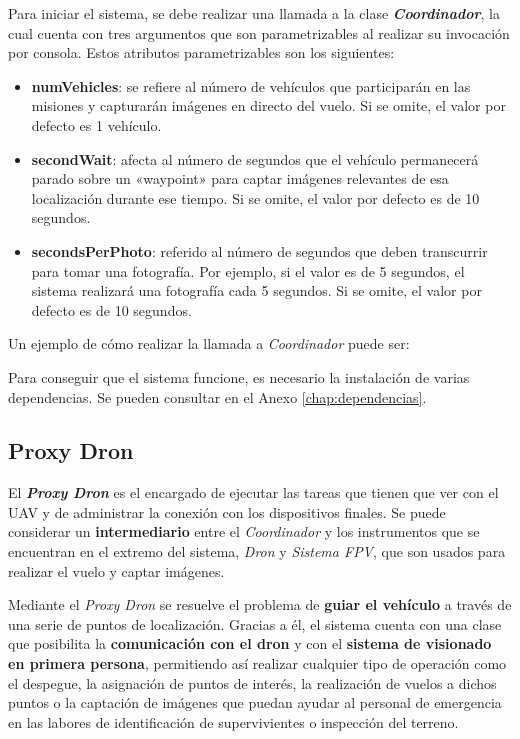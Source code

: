 Para iniciar el sistema, se debe realizar una llamada a la clase \textbf{\textit{Coordinador}}, la cual cuenta con tres argumentos que son parametrizables al realizar su invocación por consola. Estos atributos parametrizables son los siguientes:
\begin{itemize}
\item \textbf{numVehicles}: se refiere al número de vehículos que participarán en las misiones y capturarán imágenes en directo del vuelo. Si se omite, el valor por defecto es 1 vehículo.
\item \textbf{secondWait}: afecta al número de segundos que el vehículo permanecerá parado sobre un «waypoint» para captar imágenes relevantes de esa localización durante ese tiempo. Si se omite, el valor por defecto es de 10 segundos.
\item \textbf{secondsPerPhoto}: referido al número de segundos que deben transcurrir para tomar una fotografía. Por ejemplo, si el valor es de 5 segundos, el sistema realizará una fotografía cada 5 segundos. Si se omite, el valor por defecto es de 10 segundos.
\end{itemize} 

Un ejemplo de cómo realizar la llamada a \textit{Coordinador} puede ser:


Para conseguir que el sistema funcione, es necesario la instalación de varias dependencias. Se pueden consultar en el Anexo \ref{chap:dependencias}.

\subsection{Proxy Dron}
\label{sec:proxydron}

El \textbf{\textit{Proxy Dron}} es el encargado de ejecutar las tareas que tienen que ver con el \acs{UAV} y de administrar la conexión con los dispositivos finales. Se puede considerar un \textbf{intermediario} entre el \textit{Coordinador} y los instrumentos que se encuentran en el extremo del sistema, \textit{Dron} y \textit{Sistema \acs{FPV}}, que son usados para realizar el vuelo y captar imágenes.

Mediante el \textit{Proxy Dron} se resuelve el problema de \textbf{guiar el vehículo} a través de una serie de puntos de localización. Gracias a él, el sistema cuenta con una clase que posibilita la \textbf{comunicación con el dron} y con el \textbf{sistema de visionado en primera persona}, permitiendo así realizar cualquier tipo de operación como el despegue, la asignación de puntos de interés, la realización de vuelos a dichos puntos o la captación de imágenes que puedan ayudar al personal de emergencia en las labores de identificación de supervivientes o inspección del terreno.


